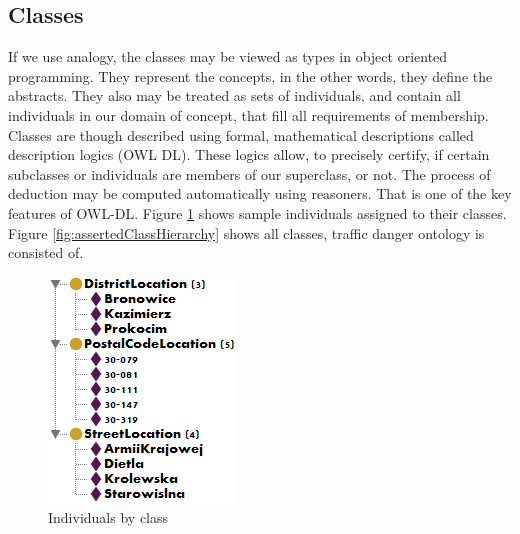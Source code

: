 \newpage

\subsection{Classes}
\label{sub:classes}

If we use analogy, the classes may be viewed as types in object oriented programming. They represent the concepts, in the other words, they define the abstracts. They also may be treated as sets of individuals, and contain all individuals in our domain of concept, that fill all requirements of membership. Classes are though described using formal, mathematical descriptions called description logics (OWL DL). These logics allow, to precisely certify, if certain subclasses or individuals are members of our superclass, or not. The process of deduction may be computed automatically using reasoners. That is one of the key features of OWL-DL. Figure \ref{fig:individualsByClass} shows sample individuals assigned to their classes. Figure \ref{fig:assertedClassHierarchy} shows all classes, traffic danger ontology is consisted of.

\medskip

\begin{figure}[htp]
\centering
\includegraphics[scale=0.7]{images/chapter3/IndividualsByClass}
\caption{Individuals by class}
\label{fig:individualsByClass}
\end{figure}

